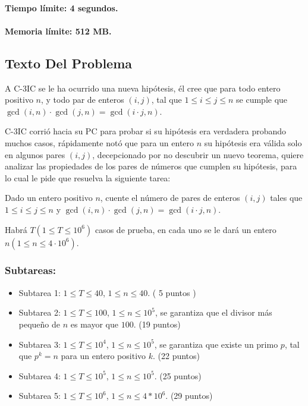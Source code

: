 \hypertarget{tiempo-luxedmite-4-segundos.}{%
\paragraph{Tiempo límite: 4
segundos.}\label{tiempo-luxedmite-4-segundos.}}

\hypertarget{memoria-luxedmite-512-mb.}{%
\paragraph{Memoria límite: 512 MB.}\label{memoria-luxedmite-512-mb.}}

\hypertarget{texto-del-problema}{%
\subsection{Texto Del Problema}\label{texto-del-problema}}

A C-3IC se le ha ocurrido una nueva hipótesis, él cree que para todo
entero positivo \(n\), y todo par de enteros \((i, j)\), tal que
\(1 \leq i \leq j \leq n\) se cumple que
\(\gcd {(i, n)} \cdot \gcd {(j , n)} = \gcd {(i \cdot j, n)}\).

C-3IC corrió hacia su PC para probar si su hipótesis era verdadera
probando muchos casos, rápidamente notó que para un entero \(n\) su
hipótesis era válida solo en algunos pares \((i, j)\), decepcionado por
no descubrir un nuevo teorema, quiere analizar las propiedades de los
pares de números que cumplen su hipótesis, para lo cual le pide que
resuelva la siguiente tarea:

Dado un entero positivo \(n\), cuente el número de pares de enteros
\((i, j)\) tales que \(1 \leq i \leq j \leq n\) y
\(\gcd {(i, n)} \cdot \gcd {(j , n)} = \gcd {(i \cdot j, n)}\).

Habrá \(T (1 \leq T \leq 10 ^ 6)\) casos de prueba, en cada uno se le
dará un entero \(n (1 \leq n \leq 4 \cdot 10 ^ 6)\).

\hypertarget{subtareas}{%
\subsubsection{Subtareas:}\label{subtareas}}

\begin{itemize}
\item
  Subtarea 1: \(1 \leq T \leq 40\), \(1 \leq n \leq 40\). ( 5 puntos )
\item
  Subtarea 2: \(1 \leq T \leq 100\), \(1 \leq n \leq 10 ^ 5\), se
  garantiza que el divisor más pequeño de \(n\) es mayor que \(100\).
  (19 puntos)
\item
  Subtarea 3: \(1 \leq T \leq 10^4\), \(1 \leq n \leq 10 ^ 5\), se
  garantiza que existe un primo \(p\), tal que \(p^k = n\) para un
  entero positivo \(k\). (22 puntos)
\item
  Subtarea 4: \(1 \leq T \leq 10 ^ 5\), \(1 \leq n \leq 10 ^ 5\). (25
  puntos)
\item
  Subtarea 5: \(1 \leq T \leq 10 ^ 6\), \(1 \leq n \leq 4 * 10 ^ 6\).
  (29 puntos)
\end{itemize}

